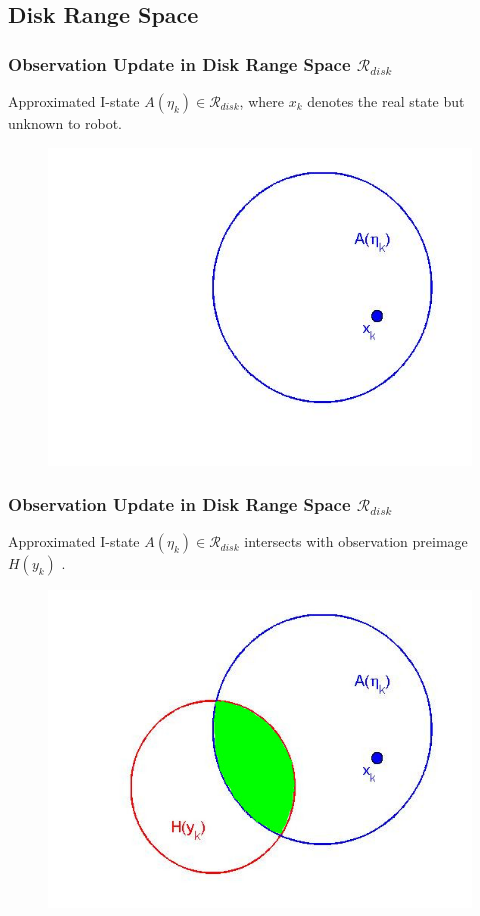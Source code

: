 \documentclass[compress]{beamer}
\begin{document}
\subsection[Disk Range Space]{Disk Range Space}
\begin{frame} \frametitle{Observation Update in Disk Range Space $\mathcal{R}_{disk}$}
 Approximated I-state $A(\eta_k) \in \mathcal{R}_{disk}$, where $x_k$ denotes the real state but unknown to robot.
			
    \begin{figure}
    \includegraphics[scale=0.3]{circle1_2.jpg}
    \end{figure}
\transboxout
\end{frame}

\begin{frame} \frametitle{Observation Update in Disk Range Space $\mathcal{R}_{disk}$}
 Approximated I-state $A(\eta_k) \in \mathcal{R}_{disk}$ intersects with observation preimage $H(y_k)$ .
			
    \begin{figure}
    \includegraphics[scale=0.3]{circle2_2.jpg}
    \end{figure}
\transboxout		
\end{frame}
\end{document}
